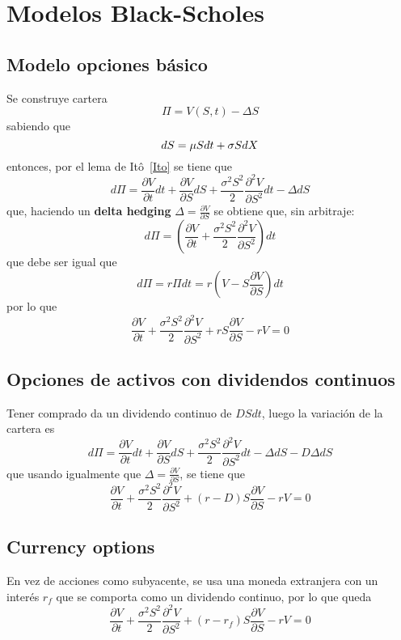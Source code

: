 
\section{Modelos Black-Scholes}




\subsection{Modelo opciones básico}
Se construye cartera
\[
\Pi = V(S,t) - \Delta S
\]
sabiendo que
\[
dS = \mu Sdt + \sigma S d\mathnormal{X}
\]
entonces, por el lema de Itô~\ref{Ito} se tiene que
\[
d\Pi = \frac{\partial V}{\partial t}dt + \frac{\partial V}{\partial S}dS + \frac{\sigma^2S^2}{2} \frac{\partial^2 V}{\partial S^2}dt - \Delta dS
\]
que, haciendo un \textbf{delta hedging} $\Delta = \frac{\partial V}{\partial S}$ se obtiene que, sin arbitraje:
\[
d\Pi = \left( \frac{\partial V}{\partial t} + \frac{\sigma^2S^2}{2} \frac{\partial^2 V}{\partial S^2} \right)dt
\]
que debe ser igual que
\[
d\Pi = r\Pi dt = r\left( V - S \frac{\partial V}{\partial S} \right)dt
\]
por lo que
\[
\boxed{\frac{\partial V}{\partial t} + \frac{\sigma^2S^2}{2} \frac{\partial^2 V}{\partial S^2} + rS \frac{\partial V}{\partial S} -rV = 0}
\]



\subsection{Opciones de activos con dividendos continuos}
Tener comprado da un dividendo continuo de $DSdt$, luego la variación de la cartera es
\[
d\Pi = \frac{\partial V}{\partial t}dt + \frac{\partial V}{\partial S}dS + \frac{\sigma^2S^2}{2} \frac{\partial^2 V}{\partial S^2}dt - \Delta dS - D\Delta dS
\]
que usando igualmente que $\Delta = \frac{\partial V}{\partial S}$, se tiene que
\[
\boxed{\frac{\partial V}{\partial t} + \frac{\sigma^2S^2}{2} \frac{\partial^2 V}{\partial S^2} + (r-D)S \frac{\partial V}{\partial S} -rV = 0}
\]



\subsection{Currency options}
En vez de acciones como subyacente, se usa una moneda extranjera con un interés $r_f$ que se comporta como un dividendo continuo, por lo que queda
\[
\boxed{\frac{\partial V}{\partial t} + \frac{\sigma^2S^2}{2} \frac{\partial^2 V}{\partial S^2} + (r-r_f)S \frac{\partial V}{\partial S} -rV = 0}
\]





